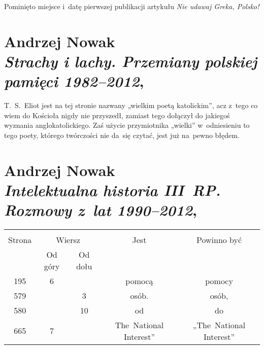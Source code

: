 \documentclass[a4paper,11pt]{article}
\numberwithin{equation}{section}
\begin{document}


 Pominięto miejsce i~datę pierwszej publikacji
artykułu \textit{Nie udawaj Greka, Polsko!}

\VerSpaceFour











\section{ %
  Andrzej Nowak \\
  \textit{Strachy i lachy. Przemiany polskiej pamięci 1982--2012},
  \cite{}}




 T.~S.~Eliot jest na tej stronie nazwany „wielkim
poetą katolickim”, acz z~tego co wiem do Kościoła nigdy nie
przyszedł, zamiast tego dołączył do jakiegoś wyznania
anglokatolickiego. Zaś użycie przymiotnika „wielki” w~odniesieniu to
tego poety, którego twórczości nie da~się czytać, jest już na~pewno
błędem.













\section{ %
  Andrzej Nowak \\
  \textit{Intelektualna historia III~RP. Rozmowy z~lat 1990--2012},
  \cite{NowakIntelektualnaHistoriaIIIRP2013}}




\begin{center}

  \begin{tabular}{|c|c|c|c|c|}
    \hline
    & \multicolumn{2}{c|}{} & & \\
    Strona & \multicolumn{2}{c|}{Wiersz} & Jest
                              & Powinno być \\ \cline{2-3}
    & Od góry & Od dołu & & \\
    \hline
    195 &  6 & & pomocą & pomocy \\
    579 & &  3 & osób. & osób, \\
    580 & & 10 & od & do \\
    665 &  7 & & The~National Interest” & „The~National Interest” \\
    \hline
  \end{tabular}

\end{center}
\end{document}
